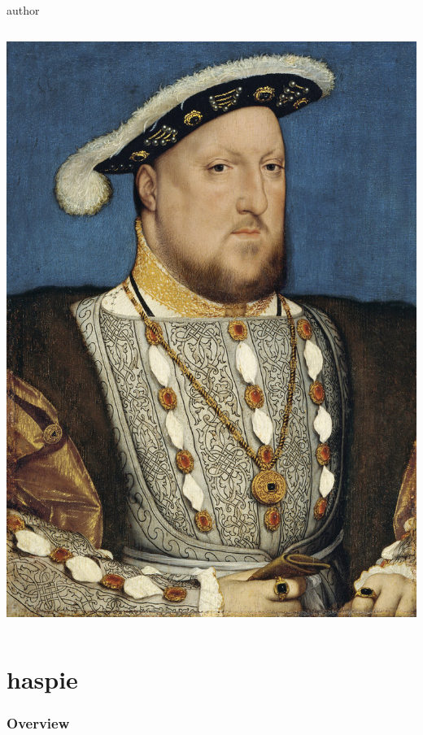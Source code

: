 \documentclass[english,fragile]{beamer}
\begin{document}
\begin{frame}
\begin{beamercolorbox}[leftskip=8cm,center,wd=0.7\textwidth]{author}
\begin{columns}[T]
\begin{column}{.30\textwidth}
				 \includegraphics[width=\linewidth]{imagenes/henry_viii.jpg}
				\end{column}
				\end{columns}
				\end{beamercolorbox}
				
\end{frame}

\section{haspie}
\begin{frame}
	\frametitle{Overview}
\end{frame}
\end{document}
